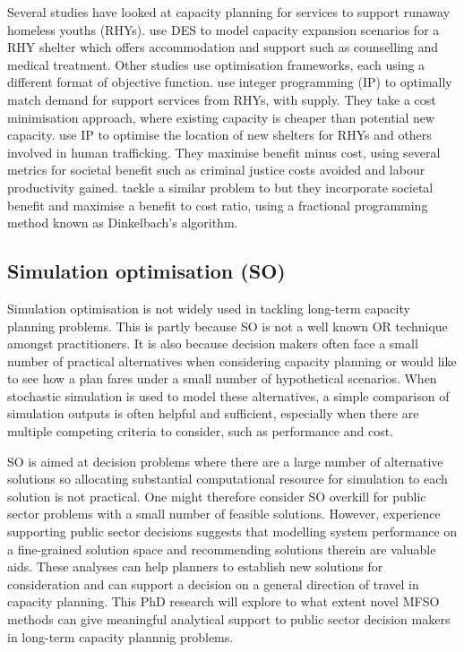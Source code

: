 \documentclass[12pt,a4paper]{article}
\begin{document}
Several studies have looked at capacity planning for services to support runaway homeless youths (RHYs). \cite{kaya2022discrete} use DES to model capacity expansion scenarios for a RHY shelter which offers accommodation and support such as counselling and medical treatment. Other studies use optimisation frameworks, each using a different format of objective function. \cite{kaya2022improving} use integer programming (IP) to optimally match demand for support services from RHYs, with supply. They take a cost minimisation approach, where existing capacity is cheaper than potential new capacity. \cite{maass2020optimizing} use IP to optimise the location of new shelters for RHYs and others involved in human trafficking. They maximise benefit minus cost, using several metrics for societal benefit such as criminal justice costs avoided and labour productivity gained. \cite{miller2022optimization} tackle a similar problem to \cite{kaya2022improving} but they incorporate societal benefit and maximise a benefit to cost ratio, using a fractional programming method known as Dinkelbach's algorithm. 

\subsection{Simulation optimisation (SO)} \label{so}

Simulation optimisation is not widely used in tackling long-term capacity planning problems. This is partly because SO is not a well known OR technique amongst practitioners. It is also because decision makers often face a small number of practical alternatives when considering capacity planning or would like to see how a plan fares under a small number of hypothetical scenarios. When stochastic simulation is used to model these alternatives, a simple comparison of simulation outputs is often helpful and sufficient, especially when there are multiple competing criteria to consider, such as performance and cost.

SO is aimed at decision problems where there are a large number of alternative solutions so allocating substantial computational resource for simulation to each solution is not practical. One might therefore consider SO overkill for public sector problems with a small number of feasible solutions. However, experience supporting public sector decisions suggests that modelling system performance on a fine-grained solution space and recommending solutions therein are valuable aids. These analyses can help planners to establish new solutions for consideration and can support a decision on a general direction of travel in capacity planning. This PhD research will explore to what extent novel MFSO methods can give meaningful analytical support to public sector decision makers in long-term capacity plannnig problems.
\end{document}
